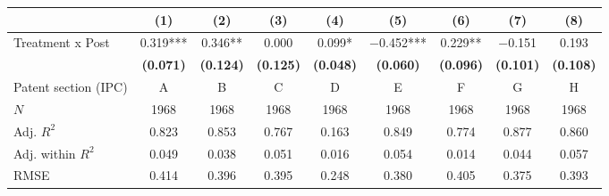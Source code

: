 
\begin{tabular}[t]{lcccccccc}
\toprule
  & (1) & (2) & (3) & (4) & (5) & (6) & (7) & (8)\\
\midrule
Treatment x Post & \num{0.319}*** & \num{0.346}** & \num{0.000} & \num{0.099}* & \num{-0.452}*** & \num{0.229}** & \num{-0.151} & \num{0.193}\\
\textbf{} & \textbf{(\num{0.071})} & \textbf{(\num{0.124})} & \textbf{(\num{0.125})} & \textbf{(\num{0.048})} & \textbf{(\num{0.060})} & \textbf{(\num{0.096})} & \textbf{(\num{0.101})} & \textbf{(\num{0.108})}\\
\midrule
Patent section (IPC) & A & B & C & D & E & F & G & H\\
$N$ & \num{1968} & \num{1968} & \num{1968} & \num{1968} & \num{1968} & \num{1968} & \num{1968} & \num{1968}\\
Adj. $R^2$ & \num{0.823} & \num{0.853} & \num{0.767} & \num{0.163} & \num{0.849} & \num{0.774} & \num{0.877} & \num{0.860}\\
Adj. within $R^2$ & \num{0.049} & \num{0.038} & \num{0.051} & \num{0.016} & \num{0.054} & \num{0.014} & \num{0.044} & \num{0.057}\\
RMSE & \num{0.414} & \num{0.396} & \num{0.395} & \num{0.248} & \num{0.380} & \num{0.405} & \num{0.375} & \num{0.393}\\
\bottomrule
\end{tabular}
